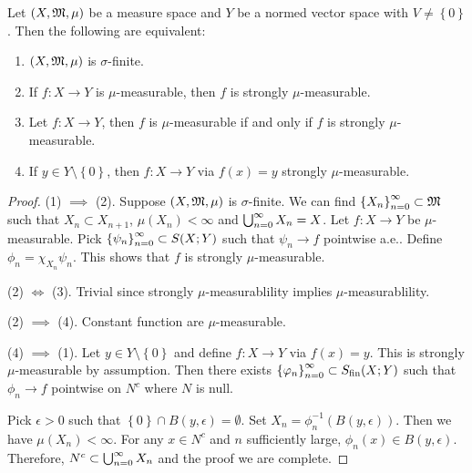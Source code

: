 \documentclass[a4paper]{article}
\begin{document}
\begin{thm}
  Let $(X,\mathfrak{M}, \mu)$ be a measure space and 
  $Y$ be a normed vector space with $V \neq \left\{ 0 
  \right\}$. Then the following are equivalent:
  \begin{enumerate}
    \item $(X, \mathfrak{M}, \mu)$ is $\sigma$-finite.
    \item If $f: X \to Y$ is $\mu$-measurable, then 
    $f$ is strongly $\mu$-measurable.
    \item Let $f: X \to Y$, then $f$ is $\mu$-measurable
    if and only if $f$ is strongly $\mu$-measurable.
    \item If $y \in Y \setminus \left\{ 0 \right\}$, 
    then $f: X \to Y$ via $f(x) = y$ strongly 
    $\mu$-measurable.
  \end{enumerate}
\end{thm}

\begin{proof}
  (1) $\implies$ (2). Suppose $(X, \mathfrak{M}, \mu)$ is 
  $\sigma$-finite. We can find $\left\{ X_n \right\}_{n=0}^\infty 
  \subset \mathfrak{M}$ such that $X_n \subset X_{n+1}$, 
  $\mu(X_n) < \infty$ and $\bigcup_{n=0}^\infty X_n = X$. 
  Let $f: X \to Y$ be $\mu$-measurable. Pick 
  $\left\{ \psi_n \right\}_{n=0}^\infty \subset S(X; Y)$ such that
  $\psi_n \to f$ pointwise a.e.. Define 
  $\phi_n = \chi_{X_n} \psi_n$. This shows that 
  $f$ is strongly $\mu$-measurable.

  (2) $\iff$ (3). Trivial since strongly $\mu$-measurablility
  implies $\mu$-measurablility.

  (2) $\implies$ (4). Constant function are $\mu$-measurable.

  (4) $\implies$ (1). Let $y \in Y \setminus \left\{ 0 \right\}$
  and define $f : X \to Y$ via $f(x) = y$. This 
  is strongly $\mu$-measurable by assumption. 
  Then there exists $\left\{ \varphi_n \right\}_{n=0}^\infty \subset S_{\text{fin}}(X; Y)$ 
  such that $\phi_n \to f$ pointwise on $N^c$ where 
  $N$ is null. 

  Pick $\epsilon > 0$ such that $\left\{ 0 \right\} 
  \cap B(y, \epsilon) = \emptyset$. Set 
  $X_n = \phi_n^{-1} (B(y, \epsilon))$. Then we have 
  $\mu(X_n) < \infty$. For any $x \in N^c$ and $n$ 
  sufficiently large, $\phi_n(x) \in B(y, \epsilon)$.
  Therefore, $N^c \subset \bigcup_{n=0}^\infty X_n$ and 
  the proof we are complete.
\end{proof}
\end{document}
